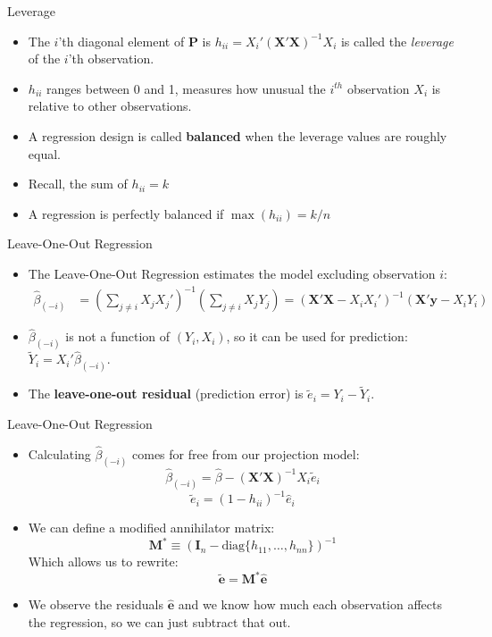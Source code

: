 \documentclass[aspectratio=169, handout, t]{beamer}
\numberwithin{equation}{section}
\begin{document}
\begin{frame}{Leverage}
\begin{itemize}
\item The $i$'th diagonal element of $\bm{P}$ is $h_{ii}=X_i'(\bm{X}'\bm{X})^{-1}X_i$ is called the \emph{leverage} of the $i$'th observation. 
\item $h_{ii}$ ranges between 0 and 1, measures how unusual the $i^{th}$ observation $X_i$ is relative to other observations.
\item A regression design is called \textbf{balanced} when the leverage values are roughly equal.  
\item Recall, the sum of $h_{ii}=k$
\item A regression is perfectly balanced if $\max(h_{ii})=k/n$
\end{itemize}
\end{frame}


\begin{frame}{Leave-One-Out Regression}
\small
\begin{itemize}\itemsep=2pt
\item The Leave-One-Out Regression estimates the model excluding observation $i$:
\vspace{-0.3em}
\begin{align*}
\hat{\beta}_{(-i)}&=\left( \sum_{j\neq i}X_jX_j'\right)^{-1}\left( \sum_{j\neq i}X_jY_j\right)
=\left(\bm{X'X}-X_iX_i'\right)^{-1}\left( \bm{X'y}-X_iY_i\right)
\end{align*}
\vspace{-0.8em}
\item $\hat{\beta}_{(-i)}$ is not a function of $(Y_i, X_i)$, so it can be used for prediction: $\tilde{Y}_i=X_i'\hat{\beta}_{(-i)}$.
\item The \textbf{leave-one-out residual} (prediction error) is $\tilde{e}_i=Y_i-\tilde{Y}_i$.
\end{itemize}
\end{frame}

\begin{frame}{Leave-One-Out Regression}
\begin{itemize}
\item Calculating $\hat{\beta}_{(-i)}$ comes for free from our projection model:
$$\hat{\beta}_{(-i)}=\hat{\beta}-(\bm{X}'\bm{X})^{-1}X_i\tilde{e}_i$$
$$\tilde{e}_i=(1-h_{ii})^{-1}\hat{e}_i$$
\item We can define a modified annihilator matrix: 
$$\bm{M}^*\equiv (\bm{I}_n-\text{diag}\{h_{11},\ldots,h_{nn}\})^{-1}$$
Which allows us to rewrite:
$$\tilde{\bm{e}}=\bm{M}^*\hat{\bm{e}}$$
\item We observe the residuals $\hat{\bm{e}}$ and we know how much each observation affects the regression, so we can just subtract that out.
\end{itemize}
\end{frame}
\end{document}
